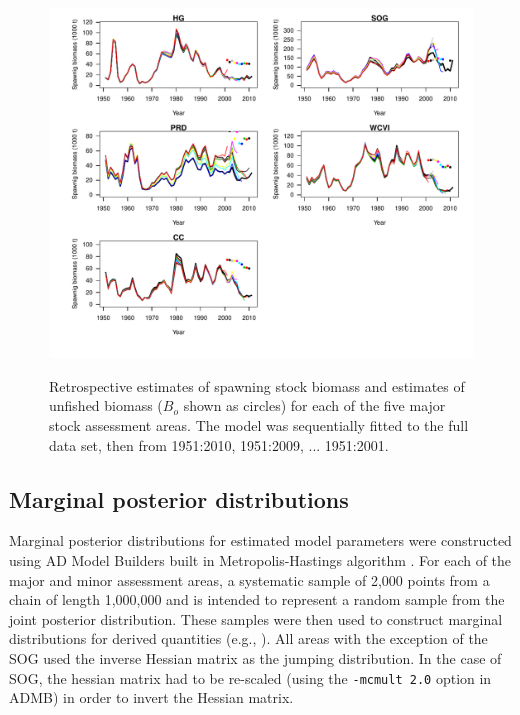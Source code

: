 \begin{figure}[!tbp]
	\includegraphics[width=\textwidth]{../FIGS/qPriorFigs/iscam_fig_sbt_retrospective.pdf}\\
	\caption{Retrospective estimates of spawning stock biomass and estimates of unfished biomass ($B_o$ shown as circles) for each of the five major stock assessment areas.  The model was sequentially fitted to the full data set, then from 1951:2010, 1951:2009, ... 1951:2001.}\label{fig:PartII:sbRetrospective}
\end{figure}


\subsection{Marginal posterior distributions}
Marginal posterior distributions for estimated model parameters were constructed using AD Model Builders built in Metropolis-Hastings algorithm \citep{gelman2004bayesian}.  For each of the major and minor assessment areas, a systematic sample of 2,000 points from a chain of length 1,000,000 and is intended to represent a random sample from the joint posterior distribution.  These samples were then used to construct marginal distributions for derived quantities (e.g., \bo).  All areas with the exception of the SOG used the inverse Hessian matrix as the jumping distribution.  In the case of SOG, the hessian matrix had to be re-scaled (using the \texttt{-mcmult 2.0} option in ADMB) in order to invert the Hessian matrix.


